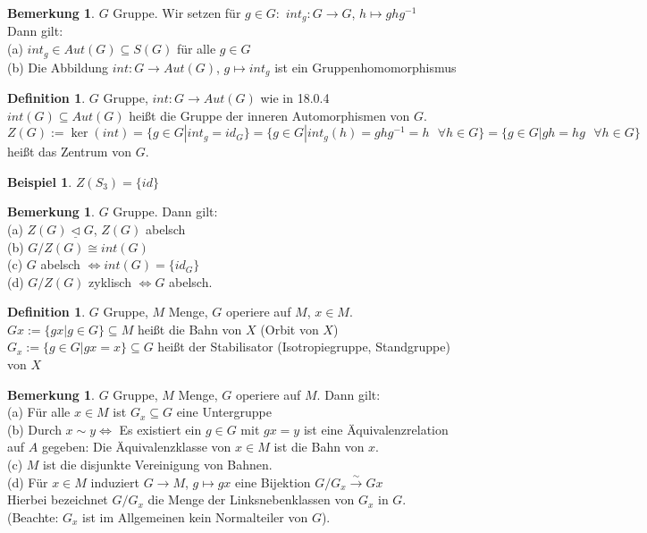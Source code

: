 \documentclass[10pt,a4paper,numbers=endperiod]{scrreprt}
\theoremstyle{definition}
\newtheorem{defi}[satz]{Definition}
\newtheorem{bem}[satz]{Bemerkung}
\newtheorem{bsp}[satz]{Beispiel}
\begin{document}
\begin{bem}
	$G$ Gruppe. Wir setzen für $g \in G:$ $int_g: G \rightarrow G$, $h \mapsto ghg^{-1}$\\
	Dann gilt:\\
	(a) $int_g \in Aut(G) \subseteq S(G)$ für alle $g \in G$\\
	(b) Die Abbildung $int: G \rightarrow Aut(G)$, $g \mapsto int_g$ ist ein Gruppenhomomorphismus
\end{bem}

\begin{defi}
	$G$ Gruppe, $int: G \rightarrow Aut(G)$ wie in 18.0.4\\
	$int(G) \subseteq Aut(G)$ heißt die Gruppe der inneren Automorphismen von $G$.\\
	$Z(G):= \ker(int) = \{g \in G| int_g = id_G\} = \{ g\in G| int_g(h) = ghg^{-1} = h \text{ $\forall$} h \in G\} = \{g \in G| gh = hg \text{ $\forall$} h \in G\}$\\
	heißt das Zentrum von $G$.
\end{defi}

\begin{bsp}
	$Z(S_3) = \{id\}$
\end{bsp}

\begin{bem}
	$G$ Gruppe. Dann gilt:\\
	(a) $Z(G) \underline{\vartriangleleft} G$, $Z(G)$ abelsch\\
	(b) $G/Z(G) \cong int(G)$\\
	(c) $G$ abelsch $\Leftrightarrow int(G) = \{id_G\}$\\
	(d) $G/Z(G)$ zyklisch $\Leftrightarrow G$ abelsch.
\end{bem}

\begin{defi}
	$G$ Gruppe, $M$ Menge, $G$ operiere auf $M$, $x \in M$.\\
	$Gx := \{gx| g \in G\} \subseteq M$ heißt die Bahn von $X$ (Orbit von $X$)\\
	$G_x := \{g \in G|gx = x\} \subseteq G$ heißt der Stabilisator (Isotropiegruppe, Standgruppe) von $X$
\end{defi}

\begin{bem}
	$G$ Gruppe, $M$ Menge, $G$ operiere auf $M$. Dann gilt:\\
	(a) Für alle $x \in M$ ist $G_x \subseteq G$ eine Untergruppe\\
	(b) Durch $x \sim y \Leftrightarrow$ Es existiert ein $g \in G$ mit $gx = y$ ist eine Äquivalenzrelation auf $A$ gegeben: Die Äquivalenzklasse von $x \in M$ ist die Bahn von $x$.\\
	(c) $M$ ist die disjunkte Vereinigung von Bahnen.\\
	(d) Für $x \in M$ induziert $G \rightarrow M$, $g \mapsto gx$ eine Bijektion $G/G_x \overset{\sim}{\rightarrow} Gx$\\
	Hierbei bezeichnet $G/G_x$ die Menge der Linksnebenklassen von $G_x$ in $G$.\\
	(Beachte: $G_x$ ist im Allgemeinen kein Normalteiler von $G$).
\end{bem}
\end{document}
